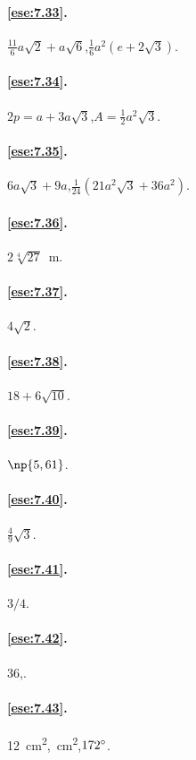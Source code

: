 \paragraph{\ref{ese:7.33}.}
$\frac{11}{6}a\sqrt{2}+a\sqrt{6}$,\quad $\frac{1}{6}a^2(e+2\sqrt{3})$.

\paragraph{\ref{ese:7.34}.}
$2p=a+3a\sqrt{3}$,\quad $A=\frac{1}{2}a^2\sqrt{3}$.

\paragraph{\ref{ese:7.35}.}
$6a\sqrt{3}+9a$,\quad $\frac{1}{24}(21a^2\sqrt{3}+36a^2)$.

\paragraph{\ref{ese:7.36}.}
$2\sqrt[4]{27}$~m.

\paragraph{\ref{ese:7.37}.}
$4\sqrt{2}$.

\paragraph{\ref{ese:7.38}.}
$18+6\sqrt{10}$.

\paragraph{\ref{ese:7.39}.}
$\np{5,61}$.

\paragraph{\ref{ese:7.40}.}
$\frac{4}{9}\sqrt{3}$.

\paragraph{\ref{ese:7.41}.}
$3/4$.

\paragraph{\ref{ese:7.42}.}
36,.

\paragraph{\ref{ese:7.43}.}
12~cm\textsuperscript{2},~cm\textsuperscript{2},\quad $172{}^{\circ}$.

